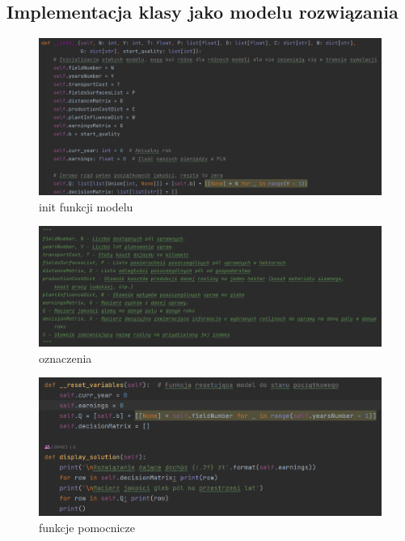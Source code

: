 \documentclass[12pt,a4paper]{article}
\begin{document}
\subsection{Implementacja klasy jako modelu rozwiązania}
\begin{figure}[H]
	\centering
	\includegraphics[width=1.1\linewidth]{screens/farm_class.png}
	\caption{init funkcji modelu}
	\label{fig:init}
\end{figure}
\begin{figure}[H]
	\centering
	\includegraphics[width=1\linewidth]{screens/oznaczenia}
	\caption{oznaczenia}
	\label{fig:oznaczenia}
\end{figure}



\begin{figure}[H]
	\centering
	\includegraphics[width=1\linewidth]{screens/funkcje_pom}
	\caption{funkcje pomocnicze}
	\label{fig:funkcjepom}
\end{figure}
\end{document}
